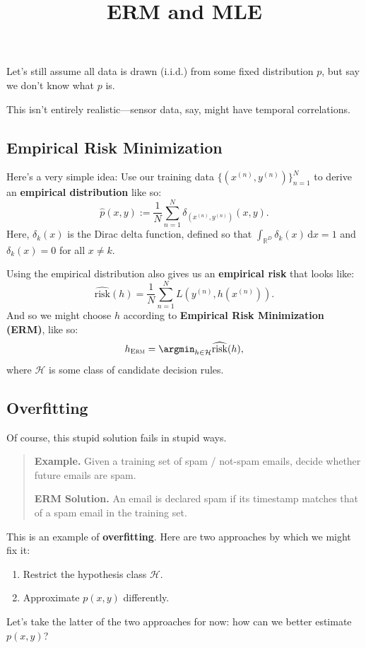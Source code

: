 \title{ERM and MLE}



Let's still assume all data is drawn (i.i.d.) from some fixed distribution $p$,
but say we don't know what $p$ is.

\begin{remark}
    This isn't entirely realistic---sensor data, say, might have temporal correlations.
\end{remark}

\subsection{Empirical Risk Minimization}

Here's a very simple idea:
Use our training data $\{(x^{(n)}, y^{(n)})\}_{n = 1}^N$ to
derive an \textbf{empirical distribution} like so:
\[ \widehat{p}(x, y) := \frac{1}{N} \sum_{n = 1}^N \delta_{(x^{(n)}, y^{(n)})}(x, y). \]
Here, $\delta_k(x)$ is the Dirac delta function, defined so that
$\int_{\mathbb{R}^D} \delta_k(x) \, \mathrm{d}x = 1$ and $\delta_k(x) = 0$ for all $x \neq k$.

Using the empirical distribution also gives us an \textbf{empirical risk} that looks like:
\[ \widehat{\text{risk}}(h) = \frac{1}{N} \sum_{n = 1}^N L(y^{(n)}, h(x^{(n)})). \]
And so we might choose $h$ according to \textbf{Empirical Risk Minimization (ERM)}, like so:
\[ h_{\textsc{Erm}} = \argmin_{h \in \mathcal{H}} \widehat{\text{risk}}(h), \]
where $\mathcal{H}$ is some class of candidate decision rules.

\subsection{Overfitting}

Of course, this stupid solution fails in stupid ways.

\begin{quote}
    \textbf{Example.} Given a training set of spam / not-spam emails,
    decide whether future emails are spam.

    \textbf{ERM Solution.} An email is declared spam if its timestamp
    matches that of a spam email in the training set.
\end{quote}

This is an example of \textbf{overfitting}.  Here are two approaches by which we might fix it:
\begin{enumerate}
    \item Restrict the hypothesis class $\mathcal{H}$.
    \item Approximate $p(x, y)$ differently.
\end{enumerate}
Let's take the latter of the two approaches for now: how can we better estimate $p(x, y)$?


